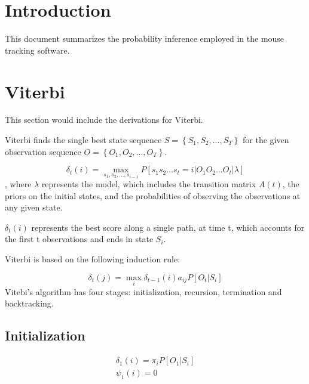 \documentclass[12pt]{article}
\begin{document}
\maketitle

\section{Introduction}
This document summarizes the probability inference employed in the mouse tracking software.


\section{Viterbi}
This section would include the derivations for Viterbi.

Viterbi finds the single best state sequence $S = \left\{ {{S_1},{S_2},...,{S_T}} \right\}$ for the given observation sequence  $O = \left\{ {{O_1},{O_2},...,{O_T}} \right\}$.

\begin{equation}
\label{Viterbi}
{\delta _t}\left( i \right) = \mathop {\max }\limits_{{s_1},{s_2},...,{s_{i - 1}}} P\left[ {{s_1}{s_2}...{s_t} = i|{O_1}{O_2}...{O_t}|\lambda } \right]
\end{equation}, where $\lambda$ represents the model, which includes the transition matrix $A(t)$, the priors on the initial states, and the probabilities of observing the observations at any given state.

${\delta _t}\left( i \right)$ represents the best score along a single path, at time t, which accounts for the first t observations and ends in state $S_i$.

Viterbi is based on the following induction rule:

\begin{equation}
\label{Viterbi_induction}
{\delta _t}\left( j \right) = \mathop {\max }\limits_i {\delta _{t - 1}}\left( i \right){a_{ij}}P\left[ {{O_t}|{S_i}} \right]
\end{equation}
Vitebi's algorithm has four stages: initialization, recursion, termination and backtracking.

\subsection{Initialization}
\begin{equation}
\label{init}
\begin{array}{l}
 {\delta _1}\left( i \right) = {\pi _i}P\left[ {{O_1}|{S_i}} \right] \\
 {\psi _1}\left( i \right) = 0 \\
 \end{array}
 \end{equation}
\end{document}
